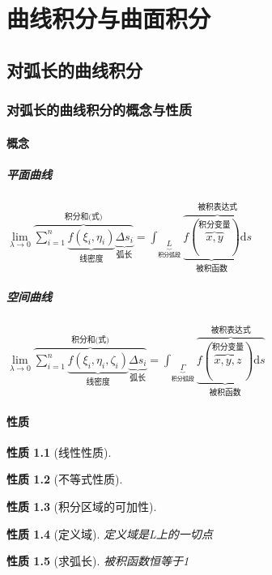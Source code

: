 \documentclass[UTF8,a4paper,12pt,scheme=chinese]{ctexbook}
\newcommand{\ud}{\mathrm{d}}
\theoremstyle{plain}
\newtheorem{property}{性质}[subsection]
\begin{document}
	\chapter{曲线积分与曲面积分}
	\section{对弧长的曲线积分}
	\subsection{对弧长的曲线积分的概念与性质}
	\subsubsection{概念}
	\paragraph{平面曲线}
	$ \lim\limits_{\lambda\rightarrow 0}
	\overbrace{\sum_{i=1}^{n}
		\underbrace{f(\xi_i,\eta_i)}
		_{\mbox{线密度}}
		\underbrace{\Delta s_i}
		_{\mbox{弧长}}}
	^{\mbox{积分和(式)}}
	=\int_{
		\underbrace{L}
		_{\mbox{积分弧段}}
	}
	\overbrace{
		\underbrace{f(
			\overbrace{x,y}
			^{\mbox{积分变量}}
			)}
		_{\mbox{被积函数}}
		\ud s}
	^{\mbox{被积表达式}}
	$
	\paragraph{空间曲线}
	$ \lim\limits_{\lambda\rightarrow 0}
	\overbrace{\sum_{i=1}^{n}
		\underbrace{f(\xi_i,\eta_i,\zeta_i)}
		_{\mbox{线密度}}
		\underbrace{\Delta s_i}
		_{\mbox{弧长}}}
	^{\mbox{积分和(式)}}
	=\int_{
		\underbrace{\varGamma}
		_{\mbox{积分弧段}}
	}
	\overbrace{
		\underbrace{f(
			\overbrace{x,y,z}
			^{\mbox{积分变量}}
			)}
		_{\mbox{被积函数}}
		\ud s}
	^{\mbox{被积表达式}}
	$
	\subsubsection{性质}
	\begin{property}[线性性质]
	\end{property}
	\begin{property}[不等式性质]
	\end{property}
	\begin{property}[积分区域的可加性]
	\end{property}
	\begin{property}[定义域]
		定义域是L上的一切点
	\end{property}
	\begin{property}[求弧长]
		被积函数恒等于1
	\end{property}
\end{document}
